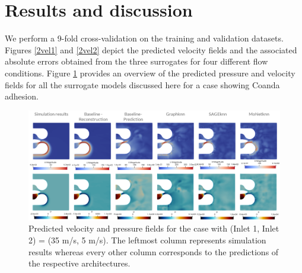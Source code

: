 \section{Results and discussion}
We perform a 9-fold cross-validation on the training and validation datasets. Figures \ref{2vel1} and \ref{2vel2} depict the predicted velocity fields and the associated absolute errors obtained from the three surrogates for four different flow conditions. Figure \ref{aloop} provides an overview of the predicted pressure and velocity fields for all the surrogate models discussed here for a case showing Coanda adhesion. \\
\begin{figure}[ht]
    \centering
    \includegraphics[width=16cm]{images/Methodology/presvelcomp.png}
    \caption{Predicted velocity and pressure fields for the case with (Inlet 1, Inlet 2) = (35 m/s, 5 m/s). The leftmost column represents simulation results whereas every other column corresponds to the predictions of the respective architectures.} 
    \label{aloop}
\end{figure}
